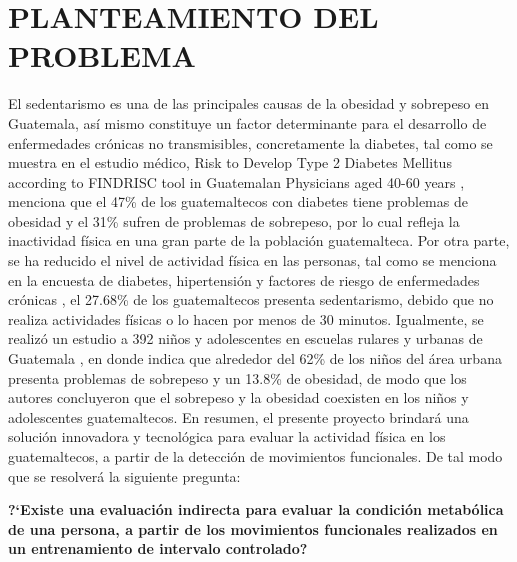 \chapter{PLANTEAMIENTO DEL PROBLEMA}
El sedentarismo es una de las principales causas de la obesidad y sobrepeso en Guatemala, as\'i mismo constituye un factor determinante para el desarrollo de enfermedades cr\'onicas no transmisibles, concretamente la diabetes, tal como se muestra en el estudio m\'edico, Risk to Develop Type 2 Diabetes Mellitus according to FINDRISC tool in Guatemalan Physicians aged 40-60 years \cite{castro2017risk}, menciona que el 47\% de los guatemaltecos con diabetes tiene problemas de obesidad y el 31\%  sufren de problemas de sobrepeso, por lo cual refleja la inactividad f\'isica en una gran parte de la poblaci\'on guatemalteca.
\medbreak
Por otra parte, se ha reducido el nivel de actividad f\'isica en las personas, tal como se menciona en la encuesta de diabetes, hipertensi\'on y factores de riesgo de enfermedades cr\'onicas \cite{orellana2006organizacion}, el 27.68\% de los guatemaltecos presenta sedentarismo, debido que no realiza actividades f\'isicas o lo hacen por menos de 30 minutos.
\medbreak
Igualmente, se realiz\'o un estudio a 392 ni\~nos y adolescentes en escuelas rulares y urbanas de Guatemala \cite{orellana2006organizacion}, en donde indica que alrededor del 62\% de los ni\~nos del  \'area urbana presenta problemas de sobrepeso y un 13.8\% de obesidad, de modo que los autores concluyeron que el sobrepeso y la obesidad coexisten en los ni\~nos y adolescentes guatemaltecos.
\medbreak
En resumen, el presente proyecto brindar\'a una soluci\'on innovadora y tecnol\'ogica para evaluar la actividad f\'isica en los guatemaltecos, a partir de la detecci\'on de movimientos funcionales. De tal modo que se resolver\'a la siguiente pregunta:
\medbreak
\begin{center}
\textbf{?`Existe una evaluaci\'on indirecta para evaluar la  condici\'on metab\'olica de una persona, a partir de los movimientos funcionales realizados en un  entrenamiento de intervalo controlado?}
\end{center}







